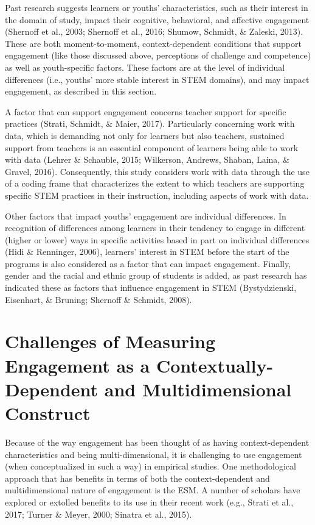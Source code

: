 \documentclass[]{msu-thesis}
\theoremstyle{definition}
\theoremstyle{definition}
\theoremstyle{definition}
\theoremstyle{remark}
\begin{document}
Past research suggests learners or youths' characteristics, such as
their interest in the domain of study, impact their cognitive,
behavioral, and affective engagement (Shernoff et al., 2003; Shernoff et
al., 2016; Shumow, Schmidt, \& Zaleski, 2013). These are both
moment-to-moment, context-dependent conditions that support engagement
(like those discussed above, perceptions of challenge and competence) as
well as youth-specific factors. These factors are at the level of
individual differences (i.e., youths' more stable interest in STEM
domains), and may impact engagement, as described in this section.

A factor that can support engagement concerns teacher support for
specific practices (Strati, Schmidt, \& Maier, 2017). Particularly
concerning work with data, which is demanding not only for learners but
also teachers, sustained support from teachers is an essential component
of learners being able to work with data (Lehrer \& Schauble, 2015;
Wilkerson, Andrews, Shaban, Laina, \& Gravel, 2016). Consequently, this
study considers work with data through the use of a coding frame that
characterizes the extent to which teachers are supporting specific STEM
practices in their instruction, including aspects of work with data.

Other factors that impact youths' engagement are individual differences.
In recognition of differences among learners in their tendency to engage
in different (higher or lower) ways in specific activities based in part
on individual differences (Hidi \& Renninger, 2006), learners' interest
in STEM before the start of the programs is also considered as a factor
that can impact engagement. Finally, gender and the racial and ethnic
group of students is added, as past research has indicated these as
factors that influence engagement in STEM (Bystydzienski, Eisenhart, \&
Bruning; Shernoff \& Schmidt, 2008).

\section{Challenges of Measuring Engagement as a Contextually-Dependent
and Multidimensional
Construct}\label{challenges-of-measuring-engagement-as-a-contextually-dependent-and-multidimensional-construct}

Because of the way engagement has been thought of as having
context-dependent characteristics and being multi-dimensional, it is
challenging to use engagement (when conceptualized in such a way) in
empirical studies. One methodological approach that has benefits in
terms of both the context-dependent and multidimensional nature of
engagement is the ESM. A number of scholars have explored or extolled
benefits to its use in their recent work (e.g., Strati et al., 2017;
Turner \& Meyer, 2000; Sinatra et al., 2015).
\end{document}
